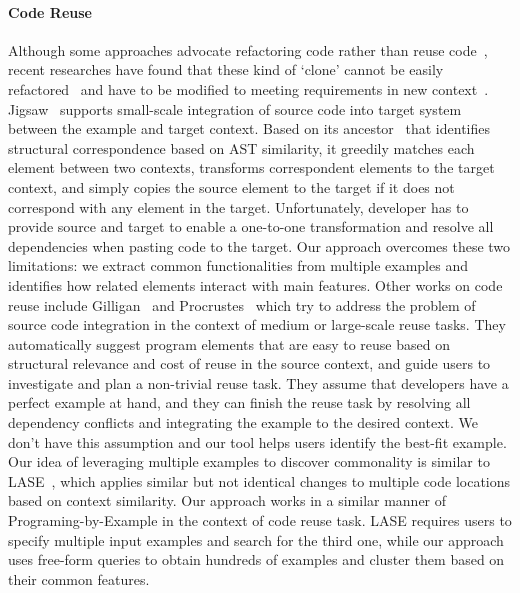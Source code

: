 \paragraph{Code Reuse}  Although some approaches advocate refactoring code rather than reuse code~\cite{fowler:refactoring}, recent researches have found that these kind of `clone' cannot be easily refactored~\cite{Kim:cloneGenealogy05} and have to be modified to meeting requirements in new context~\cite{Selby:largeReuse05}.  Jigsaw~\cite{Cottrell:jigsaw08} supports small-scale integration of source code into target system  between the example and target context. Based on its ancestor~\cite{Cottrell:generalize07} that identifies structural correspondence based on AST similarity, it greedily matches each element between two contexts, transforms correspondent elements to the target context, and simply copies the source element to the target if it does not correspond with any element in the target. Unfortunately, developer has to provide source and target to enable a one-to-one transformation and resolve all dependencies when pasting code to the target.  Our approach overcomes these two limitations: we extract common functionalities from multiple examples and  identifies how related elements interact with main features.  Other works on code reuse include
Gilligan~\cite{Holmes:reuse07} and Procrustes~\cite{Holmes:ASE09} which try to address the problem of source code integration in the context of medium or large-scale reuse tasks. They automatically suggest program elements that are easy to reuse based on structural relevance and cost of reuse in the source context, and guide users to investigate and plan a non-trivial reuse task. They assume that developers have a perfect example at hand, and they can finish the reuse task by resolving all dependency conflicts and integrating the example to the desired context.  We don't have this assumption and our tool helps users identify the best-fit example. Our idea of leveraging multiple examples to discover commonality is similar to LASE~\cite{LASE:ICSE13}, which applies similar but not identical changes to multiple code locations based on context similarity.   Our approach works in a similar manner of Programing-by-Example in the context of code reuse task. LASE requires users to specify multiple input examples and search for the third one, while our approach uses free-form queries to obtain hundreds of examples and cluster them based on their common features.



